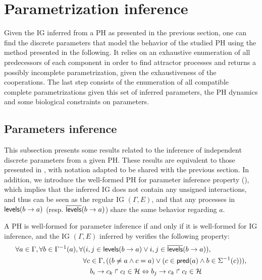 \section{Parametrization inference}\label{sec:infer-K}

Given the IG inferred from a PH as presented in the previous section, one can find the discrete parameters that model the behavior of the studied PH using the method presented in the following.
It relies on an exhaustive enumeration of all predecessors of each component in order to find attractor processes and returns a possibly incomplete parametrization, given the exhaustiveness of the cooperations.
The last step consists of the enumeration of all compatible complete parametrizations given this
set of inferred parameters, the PH dynamics and some biological constraints on parameters.

\subsection{Parameters inference}

This subsection presents some results related to the inference of independent discrete parameters from a given PH.
These results are equivalent to those presented in \cite{PMR10-TCSB}, with notation adapted to be shared with the previous section.
In addition, we introduce the well-formed PH for parameter inference property (),
which implies that the inferred IG does not contain any unsigned interactions, and thus can be seen as the
regular IG $(\Gamma, E)$,
and that any processes in $\mathsf{levels}(b\rightarrow a)$ (resp. $\overline{\mathsf{levels}}(b\rightarrow a)$) share the same behavior
regarding $a$.

\begin{property}\label{pro:wf-ph-K}
A PH is well-formed for parameter inference if and only if
it is well-formed for IG inference, and
the IG $(\Gamma, E)$ inferred by 
verifies the following property:
\begin{align*}
  \begin{split}
  \forall a \in \Gamma, \forall b\in \Gamma^{-1}(a)&,
          \forall (i,j\in\mathsf{levels}(b\rightarrow a) \vee i,j\in\overline{\mathsf{levels}}(b\rightarrow a)), \\
  & \quad \forall c \in \Gamma, ( (b\neq a\wedge c=a) \vee (c\in\mathsf{pred}(a) \wedge b\in\Sigma^{-1}(c))), \\
  & \qquad
                          b_i\rightarrow c_k\Rsh c_l\in\mathcal{H} \Leftrightarrow
                                  b_j\rightarrow c_k\Rsh c_l\in\mathcal{H}
  \end{split}
\end{align*}
\end{property}

